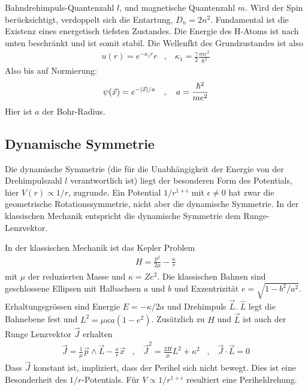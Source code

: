 Bahndrehimpuls-Quantenzahl $l$, und magnetische Quantenzahl $m$. Wird der Spin
berücksichtigt, verdoppelt sich die Entartung, $D_n = 2n^2$. Fundamental ist
die Existenz eines energetisch tiefsten Zustandes. Die Energie des H-Atoms ist
nach unten beschränkt und ist somit stabil. Die Wellenfkt des Grundzustandes ist
also
\begin{align*}
    u(r) = e^{-\kappa_1 r} r
    \hspace{10pt} , \hspace{10pt}
    \kappa_1 = \frac{\gamma}{2} \frac{m e^2}{\hbar^2}
\end{align*}
Also bis auf Normierung:
\begin{align*}
    \psi(\vec{x}) = e^{-\left\vert \vec{x} \right\vert/a}
    \hspace{10pt} , \hspace{10pt}
    a = \frac{\hbar^2}{m e^2}
\end{align*}
Hier ist $a$ der Bohr-Radius.

\subsection{Dynamische Symmetrie}

Die dynamische Symmetrie (die für die Unabhängigkeit der Energie von der
Drehimpulszahl $l$ verantwortlich ist) liegt der besonderen Form des Potentials,
hier $V(r) \propto 1/r$, zugrunde. Ein Potential $1/r^{1+\epsilon}$ mit $\epsilon
\neq 0$ hat zwar die geometrische Rotationssymmetrie, nicht aber die dynamische
Symmetrie. In der klassischen Mechanik entspricht die dynamische Symmetrie dem
Runge-Lenzvektor.

In der klassischen Mechanik ist das Kepler Problem
\begin{align*}
    H = \frac{p^2}{2 \mu} - \frac{\kappa}{r}
\end{align*}
mit $\mu$ der reduzierten Masse und $\kappa = Z e^2$. Die klassischen Bahnen
sind geschlossene Ellipsen mit Halbachsen $a$ und $b$ und Exzentrizität
$e = \sqrt{1-b^2/a^2}$. Erhaltungsgrössen sind Energie $E = -\kappa/2a$ und
Drehimpuls $\vec{L}$. $\hat{L}$ legt die Bahnebene fest und $L^2 = \mu \kappa a
(1-e^2)$. Zusätzlich zu $H$ und $\vec{L}$ ist auch der Runge Lenzvektor $\vec{J}$
erhalten
\begin{align*}
    \vec{J} = \frac{1}{\mu} \vec{p} \wedge \vec{L} - \frac{\kappa}{r} \vec{x}
    \hspace{10pt} , \hspace{10pt}
    \vec{J}^2 = \frac{2H}{\mu} L^2 + \kappa^2
    \hspace{10pt} , \hspace{10pt}
    \vec{J} \cdot \vec{L} = 0
\end{align*}
Dass $\vec{J}$ konstant ist, impliziert, dass der Perihel sich nicht bewegt.
Dies ist eine Besonderheit des $1/r$-Potentials. Für $V \propto 1/r^{1+\epsilon}$
resultiert eine Periheldrehung.

